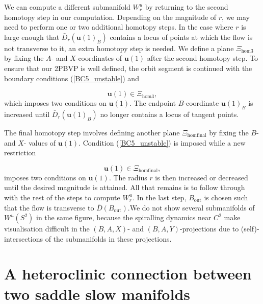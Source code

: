 \documentclass{ws-ijbc}
\begin{document}
We can compute a different submanifold $W^u_r$ by returning to the second homotopy step in our computation.   Depending on the magnitude of $r$, we may need to perform one or two additional homotopy steps.  In the case where $r$ is large enough that $\bar{D}_r(\mathbf{u}(1)_B)$ contains a locus of points at which the flow is not transverse to it, an extra homotopy step is needed.  We define a plane $\Xi_{\mathrm{hom3}}$ by fixing the $A$- and $X$-coordinates of $\mathbf{u}(1)$ after the second homotopy step.  To ensure that our 2PBVP is well defined, the orbit segment is continued with the boundary conditions (\ref{BC5_unstable}) and

\begin{equation}
\mathbf{u}(1) \in \Xi_{\mathrm{hom3}},
\label{BC8_unstable}
\end{equation}
\noindent
which imposes two conditions on $\mathbf{u}(1)$.  The endpoint $B$-coordinate $\mathbf{u}(1)_B$ is increased until $\bar{D}_r(\mathbf{u}(1)_B)$ no longer contains a locus of tangent points.

The final homotopy step involves defining another plane $\Xi_{\mathrm{homfinal}}$ by fixing the $B$- and $X$- values of $\mathbf{u}(1)$.  Condition (\ref{BC5_unstable}) is imposed while a new restriction

\begin{equation}
\mathbf{u}(1) \in \Xi_{\mathrm{homfinal}},
\label{BC9_unstable}
\end{equation}
\noindent
imposes two conditions on $\mathbf{u}(1)$.  The radius $r$ is then increased or decreased until the desired magnitude is attained.  All that remains is to follow through with the rest of the steps to compute $W^u_r$.  In the last step, $B_{\text{out}}$ is chosen such that the flow is transverse to $\bar{D}(B_{\text{out}})$.We do not show several submanifolds of $W^u(S^2)$ in the same figure, because the spiralling dynamics near $C^2$ make visualisation difficult in the $(B,A,X)$- and $(B,A,Y)$-projections due to (self)-intersections of the submanifolds in these projections.


\section{A heteroclinic connection between two saddle slow manifolds}
\end{document}
